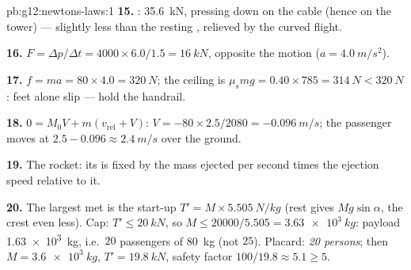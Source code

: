 \begin{solution}{pb:g12:newtons-laws:1}
\textbf{15.} : \qty{35.6}{kN}, pressing down on the
cable (hence on the tower) --- slightly less than the resting ,
relieved by the curved flight.

\textbf{16.} $F = \Delta p/\Delta t = 4000 \times 6.0/1.5 =
\qty{16}{kN}$, opposite the motion ($a = \qty{4.0}{m/s^2}$).

\textbf{17.} $f = ma = 80 \times 4.0 = \qty{320}{N}$; the ceiling is
$\mu_s mg = 0.40 \times 785 = \qty{314}{N} < \qty{320}{N}$: feet
alone slip --- hold the handrail.

\textbf{18.} $0 = M_0 V + m(v_{\text{rel}} + V)$:
$V = -80 \times 2.5/2080 = \qty{-0.096}{m/s}$; the passenger moves at
$2.5 - 0.096 \approx \qty{2.4}{m/s}$ over the ground.

\textbf{19.} The rocket: its  is fixed by the mass ejected per
second times the ejection speed relative to it.

\textbf{20.} The largest  met is the start-up
$T' = M \times \qty{5.505}{N/kg}$ (rest gives $Mg\sin\alpha$, the
crest even less). Cap: $T' \leq \qty{20}{kN}$, so
$M \leq 20000/5.505 = \qty{3.63e3}{kg}$: payload
\qty{1.63e3}{kg}, i.e.\ $20$ passengers of \qty{80}{kg} (not $25$).
Placard: \emph{20 persons}; then $M = \qty{3.6e3}{kg}$,
$T' = \qty{19.8}{kN}$, safety factor $100/19.8 \approx 5.1 \geq 5$.
\end{solution}
